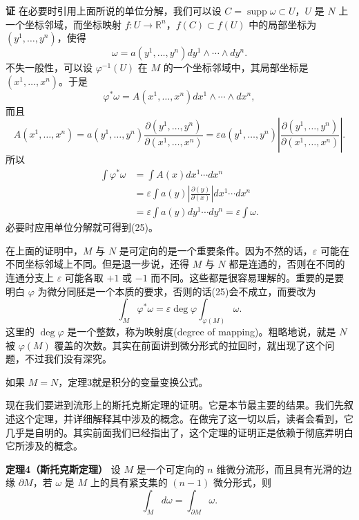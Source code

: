 \noindent\textbf{证}\quad
在必要时引用上面所说的单位分解，我们可以设 $C=\operatorname{supp}\omega\subset U$，$U$ 是 $N$ 上一个坐标邻域，而坐标映射 $f:U\to\mathbb R^n$，$f(C)\subset f(U)$ 中的局部坐标为 $(y^1,\ldots,y^n)$，使得
\[
 \omega=a(y^1,\ldots,y^n)dy^1\wedge\cdots\wedge dy^n.
\]
不失一般性，可以设 $\varphi^{-1}(U)$ 在 $M$ 的一个坐标邻域中，其局部坐标是 $(x^1,\ldots,x^n)$。于是
\[
 \varphi^*\omega=A(x^1,\ldots,x^n)dx^1\wedge\cdots\wedge dx^n,
\]
而且
\[
 A(x^1,\ldots,x^n)=a(y^1,\ldots,y^n)\frac{\partial(y^1,\ldots,y^n)}{\partial(x^1,\ldots,x^n)}
 =\varepsilon a(y^1,\ldots,y^n)\left|\frac{\partial(y^1,\ldots,y^n)}{\partial(x^1,\ldots,x^n)}\right|.
\]
所以
\begin{align*}
 \int\varphi^*\omega
 &=\int A(x)dx^1\cdots dx^n\\
 &=\varepsilon\int a(y)\left|\frac{\partial(y)}{\partial(x)}\right|dx^1\cdots dx^n\\
 &=\varepsilon\int a(y)dy^1\cdots dy^n
 =\varepsilon\int\omega.
\end{align*}
必要时应用单位分解就可得到(25)。

在上面的证明中，$M$ 与 $N$ 是可定向的是一个重要条件。因为不然的话，$\varepsilon$ 可能在不同坐标邻域上不同。但是退一步说，还得 $M$ 与 $N$ 都是连通的，否则在不同的连通分支上 $\varepsilon$ 可能各取 $+1$ 或 $-1$ 而不同。这些都是很容易理解的。重要的是要明白 $\varphi$ 为微分同胚是一个本质的要求，否则的话(25)会不成立，而要改为
\[
 \int_M\varphi^*\omega=\varepsilon\deg\varphi\int_{\varphi(M)}\omega.
\]
这里的 $\deg\varphi$ 是一个整数，称为映射度(degree of mapping)。粗略地说，就是 $N$ 被 $\varphi(M)$ 覆盖的次数。其实在前面讲到微分形式的拉回时，就出现了这个问题，不过我们没有深究。

如果 $M=N$，定理3就是积分的变量变换公式。

现在我们要进到流形上的斯托克斯定理的证明。它是本节最主要的结果。我们先叙述这个定理，并详细解释其中涉及的概念。在做完了这一切以后，读者会看到，它几乎是自明的。其实前面我们已经指出了，这个定理的证明正是依赖于彻底弄明白它所涉及的概念。

\noindent\textbf{定理4（斯托克斯定理）}\quad
设 $M$ 是一个可定向的 $n$ 维微分流形，而且具有光滑的边缘 $\partial M$，若 $\omega$ 是 $M$ 上的具有紧支集的 $(n-1)$ 微分形式，则
\begin{equation}
 \int_M d\omega=\int_{\partial M}\omega.
 \tag{26}
\end{equation}

